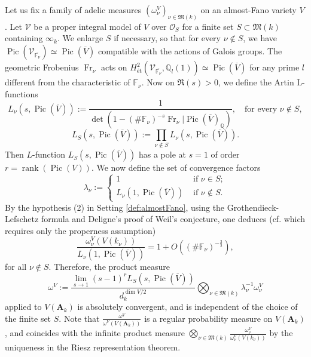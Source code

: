 \documentclass[11pt,letterpaper]{amsart}
\newcommand{\BF}{{\mathbb {F}}}
\newcommand{\BQ}{{\mathbb {Q}}}
\newcommand{\CO}{{\mathcal {O}}}
\newcommand{\CV}{{\mathcal {V}}}
\newcommand{\RA}{{\mathbf {A}}}
\newcommand{\Pic}{\operatorname{Pic}}
\theoremstyle{plain}
\numberwithin{equation}{section}
\theoremstyle{definition}
\theoremstyle{remark}
\begin{document}
Let us fix a family of adelic measures $(\omega_\nu^V)_{\nu\in\mathfrak{M}(k)}$ on an almost-Fano variety $V$. 
Let $\CV$ be a proper integral model of $V$ over $\CO_S$ for a finite set $S\subset\mathfrak{M}(k)$ containing $\infty_k$. We enlarge $S$ if necessary, so that for every $\nu\not\in S$, we have $\Pic(\CV_{\overline{\BF_\nu}})\simeq \Pic(\overline{V})$ compatible with the actions of Galois groups. The geometric Frobenius $\operatorname{Fr}_\nu$ acts on $H^2_{\text{\'et}}(\CV_{\overline{\BF_\nu}},\BQ_l(1))\simeq \Pic(\overline{V})$ for any prime $l$ different from the characteristic of $\BF_\nu$.
Now on $\Re(s)>0$, we define the Artin L-functions
\begin{equation}\label{eq:artinLnu}
	L_\nu(s,\Pic(\overline{V})):=\frac{1}{\det(1-(\#\BF_\nu)^{-s}\operatorname{Fr}_\nu|\Pic(\overline{V})_\BQ)},\quad \text{for every }\nu\not\in S,
\end{equation}
\begin{equation}\label{eq:artinLS}
	L_S(s,\Pic(\overline{V})):=\prod_{\nu\not\in S}L_\nu(s,\Pic(\overline{V})).
\end{equation}
Then $L$-function $L_S(s,\Pic(\overline{V}))$ has a pole at $s=1$ of order $r=\operatorname{rank}(\Pic(V))$.
We now define the set of convergence factors 
\begin{equation}\label{eq:convergencefact}
	\lambda_\nu:=\begin{cases}
		1 & \text{ if } \nu\in S;\\ L_\nu(1,\Pic(\overline{V})) &\text{ if }\nu\not\in S.
	\end{cases}
\end{equation}
By the hypothesis (2) in Setting \ref{def:almostFano}, using the Grothendieck-Lefschetz formula and Deligne's proof of Weil's conjecture, one deduces (cf. \cite[Proposition 2.2.2]{Peyre} which requires only the properness assumption)
$$\frac{\omega_\nu^V(V(k_\nu))}{L_\nu(1,\Pic(\overline{V}))}=1+O((\#\BF_\nu)^{-\frac{3}{2}}),$$ for all $\nu\notin S$.
Therefore, the product measure
\begin{equation}\label{eq:Tamagawameas}
	\omega^V:=\frac{\lim_{s\to 1}(s-1)^rL_S(s,\Pic(\overline{V}))}{d_k^{\dim V/2}}\bigotimes_{\nu\in\mathfrak{M}(k)}\lambda_\nu^{-1}\omega_\nu^V
\end{equation} applied to $V(\RA_k)$ is absolutely convergent, and is independent of the choice of the finite set $S$.
 Note that $\frac{\omega^V}{\omega^V(V(\RA_k))}$ is a regular probability measure on $V(\RA_k)$, and coincides with the infinite product measure $\bigotimes_{\nu\in\mathfrak{M}(k)} \frac{\omega_\nu^V}{\omega_\nu^V(V(k_\nu))}$ by the uniqueness in the Riesz representation theorem.
\end{document}
